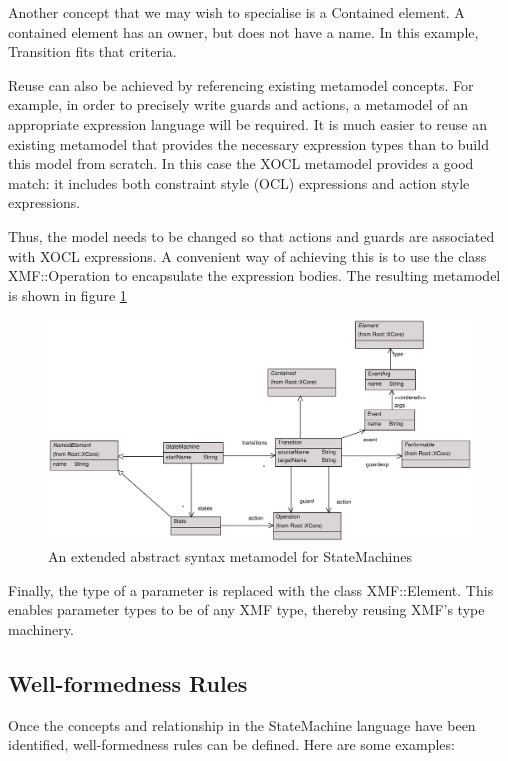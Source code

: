 Another concept that we may wish to specialise is a Contained
element. A contained element has an owner, but does not have a
name. In this example, Transition fits that criteria.

Reuse can also be achieved by referencing existing metamodel
concepts. For example, in order to precisely write guards and
actions, a metamodel of an appropriate expression language will be
required. It is much easier to reuse an existing metamodel that
provides the necessary expression types than to build this model
from scratch. In this case the XOCL metamodel provides a good
match: it includes both constraint style (OCL) expressions and
action style expressions.

Thus, the model needs to be changed so that actions and guards are
associated with XOCL expressions. A convenient way of achieving
this is to use the class XMF::Operation to encapsulate the
expression bodies. The resulting metamodel is shown in figure
\ref{stmabs2}

\begin{figure}[htb]
\begin{center}
\includegraphics[width=16cm]{AbstractSyntax/figures/SMAbs2.pdf}
\caption{An extended abstract syntax metamodel for StateMachines}
\label{stmabs2}
\end{center}
\end{figure}

Finally, the type of a parameter is replaced with the class
XMF::Element. This enables parameter types to be of any XMF type,
thereby reusing XMF's type machinery.

\subsection{Well-formedness Rules}

Once the concepts and relationship in the StateMachine language
have been identified,  well-formedness rules can be defined. Here
are some examples:

